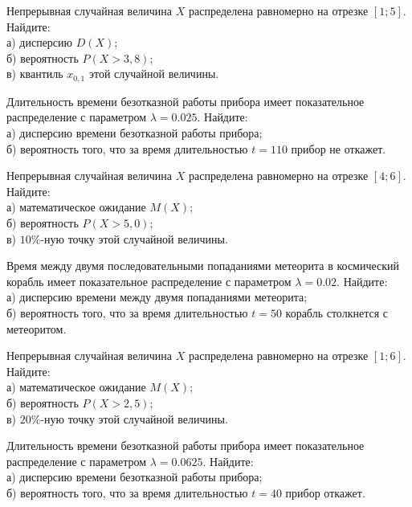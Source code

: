 \vfill

\newpage\setcounter{zad}{0}

\z Непрерывная случайная величина $X$ распределена равномерно на отрезке $[1; 5]$. Найдите: \\ \quad а) дисперсию $D(X)$; \\ \quad б) вероятность $P(X>3{,}8)$; \\ \quad в) квантиль $x_{0{,}1}$ этой случайной величины.


\vfill

\z Длительность времени безотказной работы прибора имеет показательное распределение с параметром $\lambda = 0.025$. Найдите: \\ \quad а) дисперсию времени безотказной работы прибора; \\ \quad б) вероятность того, что за время длительностью $t = 110$ прибор не откажет.
 

\vfill

\newpage\setcounter{zad}{0}

\z Непрерывная случайная величина $X$ распределена равномерно на отрезке $[4; 6]$. Найдите: \\ \quad а) математическое ожидание $M(X)$; \\ \quad б) вероятность $P(X>5{,}0)$; \\ \quad в) $10\%$-ную точку этой случайной величины.


\vfill

\z Время между двумя последовательными попаданиями метеорита в космический корабль имеет показательное распределение с параметром $\lambda = 0.02$. Найдите: \\ \quad а) дисперсию времени между двумя попаданиями метеорита; \\ \quad б) вероятность того, что за время длительностью $t = 50$ корабль  столкнется с метеоритом.
 

\vfill

\newpage\setcounter{zad}{0}

\z Непрерывная случайная величина $X$ распределена равномерно на отрезке $[1; 6]$. Найдите: \\ \quad а) математическое ожидание $M(X)$; \\ \quad б) вероятность $P(X>2{,}5)$; \\ \quad в) $20\%$-ную точку этой случайной величины.


\vfill

\z Длительность времени безотказной работы прибора имеет показательное распределение с параметром $\lambda = 0.0625$. Найдите: \\ \quad а) дисперсию времени безотказной работы прибора; \\ \quad б) вероятность того, что за время длительностью $t = 40$ прибор  откажет.
 

